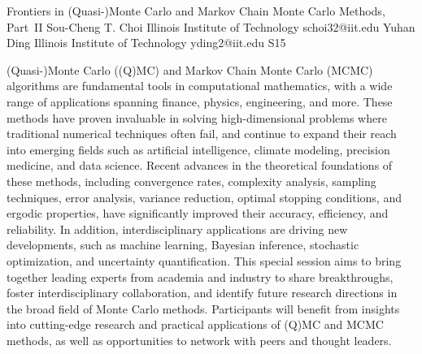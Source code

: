 \begin{session}
 {Frontiers in (Quasi-)Monte Carlo and Markov Chain Monte Carlo Methods, Part~II}%
 {Sou-Cheng T. Choi}%
 {Illinois Institute of Technology}%
 {schoi32@iit.edu}%
 {Yuhan Ding}%
 {Illinois Institute of Technology}%
 {yding2@iit.edu}%
 {S15}%
{}

 (Quasi-)Monte Carlo ((Q)MC) and Markov Chain Monte Carlo (MCMC) algorithms are fundamental tools in computational mathematics, with a wide range of applications spanning finance, physics, engineering, and more. These methods have proven invaluable in solving high-dimensional problems where traditional numerical techniques often fail, and continue to expand their reach into emerging fields such as artificial intelligence, climate modeling, precision medicine, and data science.
 Recent advances in the theoretical foundations of these methods, including convergence rates, complexity analysis, sampling techniques, error analysis, variance reduction, optimal stopping conditions, and ergodic properties, have significantly improved their accuracy, efficiency, and reliability. In addition, interdisciplinary applications are driving new developments, such as machine learning, Bayesian inference, stochastic optimization, and uncertainty quantification.
 This special session aims to bring together leading experts from academia and industry to share breakthroughs, foster interdisciplinary collaboration, and identify future research directions in the broad field of Monte Carlo methods. Participants will benefit from insights into cutting-edge research and practical applications of (Q)MC and MCMC methods, as well as opportunities to network with peers and thought leaders.
\end{session}



\clearpage

